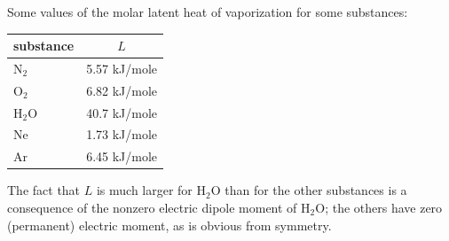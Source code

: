 Some values of the molar latent heat of vaporization for some substances:
\begin{center}
\begin{tabular}{lc}
  substance & $L$\\ \hline
  N$_2$ & 5.57 kJ/mole\\
  O$_2$ & 6.82 kJ/mole\\
  H$_2$O & 40.7 kJ/mole\\
  Ne & 1.73 kJ/mole\\
  Ar & 6.45 kJ/mole
\end{tabular}
\end{center}
The fact that $L$ is much larger for H$_2$O than for the other substances is a consequence of the nonzero electric
dipole moment of H$_2$O; the others have zero (permanent) electric moment, as is obvious from symmetry.
